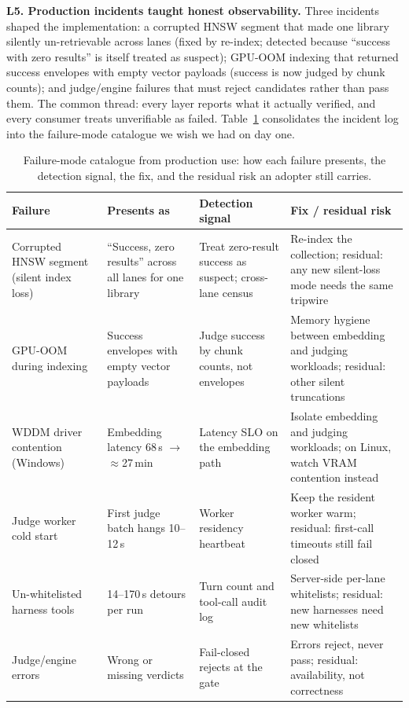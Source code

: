 \documentclass[preprint,12pt]{elsarticle}
\begin{document}
\textbf{L5. Production incidents taught honest observability.} Three
incidents shaped the implementation: a corrupted HNSW segment that made one
library silently un-retrievable across lanes (fixed by re-index; detected
because ``success with zero results'' is itself treated as suspect);
GPU-OOM indexing that returned success envelopes with empty vector payloads
(success is now judged by chunk counts); and judge/engine failures that
must reject candidates rather than pass them. The common thread: every
layer reports what it actually verified, and every consumer treats
unverifiable as failed. Table~\ref{tab:failures} consolidates the incident
log into the failure-mode catalogue we wish we had on day one.

\begin{table}[!htbp]
\centering
\footnotesize
\setlength{\tabcolsep}{4pt}
\caption{Failure-mode catalogue from production use: how each failure
presents, the detection signal, the fix, and the residual risk an adopter
still carries.}
\label{tab:failures}
\begin{tabular}{p{3.1cm}p{3.2cm}p{3.1cm}p{2.9cm}}
\toprule
Failure & Presents as & Detection signal & Fix / residual risk \\
\midrule
Corrupted HNSW segment (silent index loss) & ``Success, zero results''
across all lanes for one library & Treat zero-result success as suspect;
cross-lane census & Re-index the collection; residual: any new silent-loss
mode needs the same tripwire \\
GPU-OOM during indexing & Success envelopes with empty vector payloads &
Judge success by chunk counts, not envelopes & Memory hygiene between
embedding and judging workloads; residual: other silent truncations \\
WDDM driver contention (Windows) & Embedding latency 68\,s $\to$
$\approx$27\,min & Latency SLO on the embedding path & Isolate embedding
and judging workloads; on Linux, watch VRAM contention instead \\
Judge worker cold start & First judge batch hangs 10--12\,s & Worker
residency heartbeat & Keep the resident worker warm; residual: first-call
timeouts still fail closed \\
Un-whitelisted harness tools & 14--170\,s detours per run & Turn count and
tool-call audit log & Server-side per-lane whitelists; residual: new
harnesses need new whitelists \\
Judge/engine errors & Wrong or missing verdicts & Fail-closed rejects at
the gate & Errors reject, never pass; residual: availability, not
correctness \\
\bottomrule
\end{tabular}
\end{table}
\end{document}
